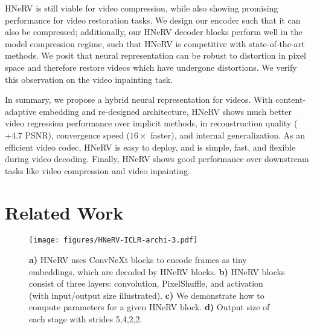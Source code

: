 \documentclass[10pt,twocolumn,letterpaper]{article}
\begin{document}
HNeRV is still viable for video compression, while also showing promising performance for video restoration tasks.
We design our encoder such that it can also be compressed; additionally, our HNeRV decoder blocks perform well in the model compression regime, such that HNeRV is competitive with state-of-the-art methods.
We posit that neural representation can be robust to distortion in pixel space and therefore restore videos which have undergone distortions.
We verify this observation on the video inpainting task.

In summary, we propose a hybrid neural representation for videos. 
With content-adaptive embedding and re-designed architecture, HNeRV shows much better video regression performance over implicit methods, in reconstruction quality ($+4.7$ PSNR), convergence speed ($16\times$ faster), and internal generalization.
As an efficient video codec, HNeRV is easy to deploy, and is simple, fast, and flexible during video decoding.
Finally, HNeRV shows good performance over downstream tasks like video compression and video inpainting.







\section{Related Work}

\begin{figure*}[t!]
    \centering
    \texttt{[image: figures/HNeRV-ICLR-archi-3.pdf]} 
    \caption{
    \textbf{a)} HNeRV uses ConvNeXt blocks to encode frames as tiny embeddings, which are decoded by HNeRV blocks.
    \textbf{b)} HNeRV blocks consist of three layers: convolution, PixelShuffle, and activation (with input/output size illustrated).
    \textbf{c)} We demonstrate how to compute parameters for a given HNeRV block.
    \textbf{d)} Output size of each stage with strides 5,4,2,2.}
    \label{fig:hnerv-archi}
    \vspace{-.5em}
\end{figure*}
\end{document}
